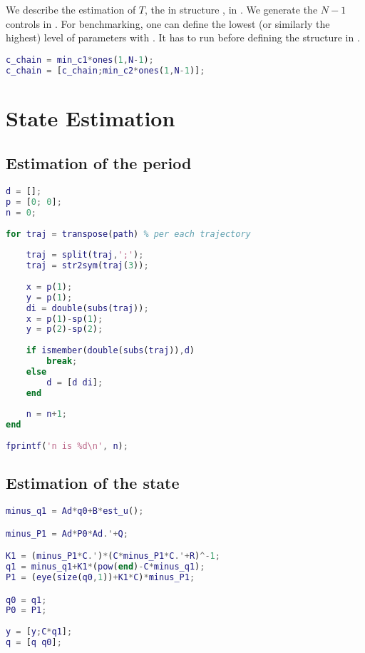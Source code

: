 We describe the estimation of $T$, the  in structure , in . We generate the $N-1$ controls in . For benchmarking, one can define the lowest (or similarly the highest) level of parameters with . It has to run before defining the structure  in .

\begin{lstlisting}[language=Matlab,caption={[Lowest control chain]Implementation of the lowest possible control for benchmarking.},captionpos=b,label=lst:lowest_control]
c_chain = min_c1*ones(1,N-1);
c_chain = [c_chain;min_c2*ones(1,N-1)];
\end{lstlisting}

\section{\color{red}State Estimation}

\subsection{\color{cyan}Estimation of the period}
\label{sec:imp_period_est}

\begin{lstlisting}[language=Matlab,caption={[Estimation of the period]Estimation of the period.},captionpos=b,label=lst:period_est]
% iterating trajectories in the plan to get the constant n (to measure the period)    
d = [];
p = [0; 0];
n = 0;
    
for traj = transpose(path) % per each trajectory
            
    traj = split(traj,';');
    traj = str2sym(traj(3));
        
    x = p(1);
    y = p(1);
    di = double(subs(traj));
    x = p(1)-sp(1);
    y = p(2)-sp(2);
        
    if ismember(double(subs(traj)),d)
        break;
    else
        d = [d di];
    end
        
    n = n+1;
end
    
fprintf('n is %d\n', n);
\end{lstlisting}

\subsection{\color{cyan}Estimation of the state}

\begin{lstlisting}[language=Matlab,caption={[Estimation of the state using Kalman filter]Estimation of the state using Kalman filter.},captionpos=b,label=lst:state_est_kf]
minus_q1 = Ad*q0+B*est_u();

minus_P1 = Ad*P0*Ad.'+Q;

K1 = (minus_P1*C.')*(C*minus_P1*C.'+R)^-1;
q1 = minus_q1+K1*(pow(end)-C*minus_q1);
P1 = (eye(size(q0,1))+K1*C)*minus_P1;

q0 = q1;        
P0 = P1;
            
y = [y;C*q1];    
q = [q q0];
\end{lstlisting}


